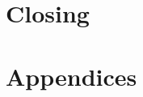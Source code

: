 \documentclass[print,thumbmain]{src/thesis}  %
\begin{document}
\part{Closing}\label{part: closing}


\appendix
\cleardoublepage
\part{Appendices}



\isstarredchaptertrue           %
%



\newpage



\thispagestyle{empty}

\ifprint{\cleardoublepage}
\else

\fi
\end{document}
